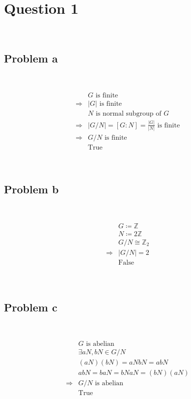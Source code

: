 \documentclass{article}
\begin{document}
\section*{Question 1}

~

\subsection*{Problem a}

~

\begin{equation*}
    \begin{split}
        &G\text{ is finite}\\
        \Rightarrow&|G|\text{ is finite}\\
        &N\text{ is normal subgroup of }G\\
        \Rightarrow&|G/N|=[G:N]=\frac{|G|}{|N|}\text{ is finite}\\
        \Rightarrow&G/N\text{ is finite}\\
        &\text{True}
    \end{split}
\end{equation*}

~

\subsection*{Problem b}

~

\begin{equation*}
    \begin{split}
        &G\coloneqq \mathbb{Z} \\
        &N\coloneqq 2\mathbb{Z} \\
        &G/N\cong\mathbb{Z} _2\\
        \Rightarrow&|G/N|=2\\
        &\text{False}\\
    \end{split}
\end{equation*}

~

\subsection*{Problem c}

~

\begin{equation*}
    \begin{split}
        &G\text{ is abelian}\\
        &\exists aN,bN\in G/N\\
        &(aN)(bN)=aNbN=abN\\
        &abN=baN=bNaN=(bN)(aN)\\
        \Rightarrow&G/N\text{ is abelian}\\
        &\text{True}\\
    \end{split}
\end{equation*}
\end{document}
